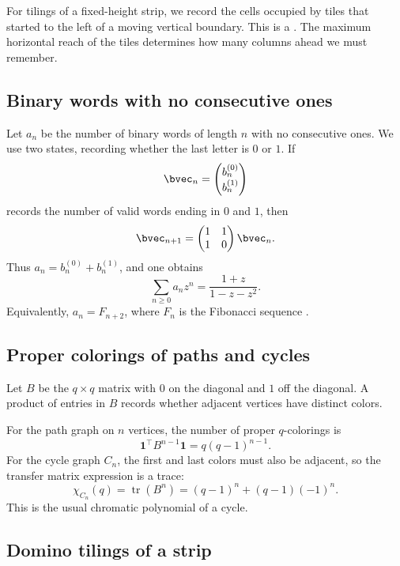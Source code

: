 For tilings of a fixed-height strip, we record the cells occupied by tiles
that started to the left of a moving vertical boundary. This is a
. The maximum horizontal reach of the tiles determines how
many columns ahead we must remember.


\subsection[transferMatrixFibonacciWords]{Binary words with no consecutive ones}

Let $a_n$ be the number of binary words of length $n$ with no consecutive ones.
We use two states, recording whether the last letter is $0$ or $1$.  If
\[
  \bvec_n =
  \begin{pmatrix}
  b_n^{(0)}\\
  b_n^{(1)}
  \end{pmatrix}
\]
records the number of valid words ending in $0$ and $1$, then
\[
  \bvec_{n+1}
  =
  \begin{pmatrix}
  1 & 1\\
  1 & 0
  \end{pmatrix}
  \bvec_n .
\]
Thus $a_n=b_n^{(0)}+b_n^{(1)}$, and one obtains
\[
  \sum_{n\geq 0} a_n z^n
  =
  \frac{1+z}{1-z-z^2}.
\]
Equivalently, $a_n=F_{n+2}$, where $F_n$ is the Fibonacci sequence
.


\subsection[transferMatrixGraphColorings]{Proper colorings of paths and cycles}

Let $B$ be the $q\times q$ matrix with $0$ on the diagonal and $1$ off the
diagonal.  A product of entries in $B$ records whether adjacent vertices have
distinct colors.

For the path graph on $n$ vertices, the number of proper $q$-colorings is
\[
  \mathbf{1}^\top B^{n-1}\mathbf{1}
  =
  q(q-1)^{n-1}.
\]
For the cycle graph $C_n$, the first and last colors must also be adjacent,
so the transfer matrix expression is a trace:
\[
  \chi_{C_n}(q)
  =
  \operatorname{tr}(B^n)
  =
  (q-1)^n + (q-1)(-1)^n .
\]
This is the usual chromatic polynomial of a cycle.


\subsection[transferMatrixDominoTilings]{Domino tilings of a strip}

